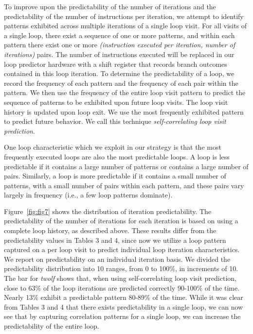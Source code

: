 \documentclass[times,10pt,twocolumn]{article}
\begin{document}
To improve upon the
predictability of the number of iterations and the 
predictability of the number of instructions per iteration,  
we attempt to identify patterns exhibited across multiple
iterations of a single loop visit. For all visits of a single loop, there 
exist a sequence of one or more patterns, and within each pattern there 
exist one or more {\em (instruction executed per iteration, number of iterations)} pairs. 
The number of instructions executed will be replaced in our loop predictor
hardware with a shift register that records branch outcomes contained in this loop 
iteration. To determine the 
predictability of a loop, we record the frequency of each pattern 
and the frequency of each pair within the pattern. We then use the 
frequency of the entire loop visit pattern to predict the sequence
of patterns to be exhibited upon future loop visits.  The loop visit history
is updated upon loop exit.  We use the most frequently
exhibited pattern to predict future behavior. We call this technique
{\em self-correlating loop visit prediction}.

One loop characteristic which we exploit in our strategy is that
the most frequently executed loops are also the most predictable loops.
A loop is less predictable if it contains a 
large number of patterns or contains a large number of pairs.
Similarly, a loop is more predictable if it contains a small number of patterns, with a
small number of pairs within each pattern, and these pairs
vary largely in frequency (i.e., a few loop patterns dominate).  

Figure~\ref{fig:fig7} shows the distribution of iteration predictability. 
The predictability of the number of iterations for each iteration
is based on using a complete loop history, as described above. 
These results differ from the predictability values in Tables 3 and 4,
since now we utilize a loop pattern captured on a per loop visit
to predict individual loop iteration characteristics.  We report on
predictability on an individual iteration basis.
We divided the predictability distribution into 10 ranges, 
from 0 to 100\%, in increments
of 10. The bar for {\it twolf} shows that, when using self-correlating loop
visit prediction,
close to 63\% of the loop iterations are predicted correctly
90-100\% of the time.  Nearly
13\% exhibit a predictable pattern 80-89\% of the time.  While it was clear 
from Tables 3 and 4 that there exists predictability in a single loop,
we can now see that 
by capturing correlation patterns for a single loop, we can
increase the predictability of the entire loop.
\end{document}
